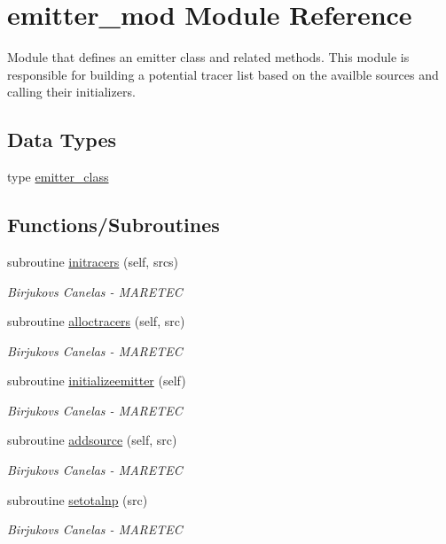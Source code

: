 \hypertarget{namespaceemitter__mod}{}\section{emitter\+\_\+mod Module Reference}
\label{namespaceemitter__mod}


Module that defines an emitter class and related methods. This module is responsible for building a potential tracer list based on the availble sources and calling their initializers.  


\subsection*{Data Types}
\begin{DoxyCompactItemize}
\item 
type \hyperlink{structemitter__mod_1_1emitter__class}{emitter\+\_\+class}
\end{DoxyCompactItemize}
\subsection*{Functions/\+Subroutines}
\begin{DoxyCompactItemize}
\item 
subroutine \hyperlink{namespaceemitter__mod_ad89dfc083eae7362441c353225a74ebc}{initracers} (self, srcs)
\begin{DoxyCompactList}\small\item\em Birjukovs Canelas -\/ M\+A\+R\+E\+T\+EC \end{DoxyCompactList}\item 
subroutine \hyperlink{namespaceemitter__mod_a7c677125988390e4c57909e4ea82d902}{alloctracers} (self, src)
\begin{DoxyCompactList}\small\item\em Birjukovs Canelas -\/ M\+A\+R\+E\+T\+EC \end{DoxyCompactList}\item 
subroutine \hyperlink{namespaceemitter__mod_a6376ad0f8e1739b29caf672aa0750373}{initializeemitter} (self)
\begin{DoxyCompactList}\small\item\em Birjukovs Canelas -\/ M\+A\+R\+E\+T\+EC \end{DoxyCompactList}\item 
subroutine \hyperlink{namespaceemitter__mod_ab704fb0e2eb9b3b4b9542706b6fb4eaf}{addsource} (self, src)
\begin{DoxyCompactList}\small\item\em Birjukovs Canelas -\/ M\+A\+R\+E\+T\+EC \end{DoxyCompactList}\item 
subroutine \hyperlink{namespaceemitter__mod_a5c219dd6692a761ad4bf968ae750fcc6}{setotalnp} (src)
\begin{DoxyCompactList}\small\item\em Birjukovs Canelas -\/ M\+A\+R\+E\+T\+EC \end{DoxyCompactList}\end{DoxyCompactItemize}


